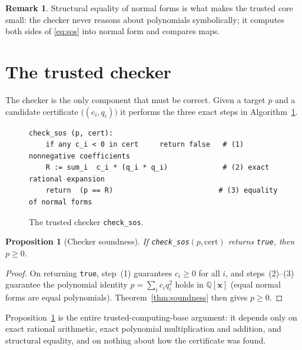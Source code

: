 \documentclass[11pt]{article}
\theoremstyle{definition}
\newtheorem{remark}[definition]{Remark}
\theoremstyle{plain}
\newtheorem{proposition}[definition]{Proposition}
\newcommand{\Q}{\mathbb{Q}}
\newcommand{\x}{\mathbf{x}}
\begin{document}
\begin{remark}
Structural equality of normal forms is what makes the trusted core small: the
checker never reasons about polynomials symbolically; it computes both sides of
\eqref{eq:sos} into normal form and compares maps.
\end{remark}

\section{The trusted checker}
\label{sec:checker}

The checker is the only component that must be correct. Given a target $p$ and a
candidate certificate $\bigl((c_i,q_i)\bigr)$ it performs the three exact steps
in Algorithm~\ref{alg:check}.

\begin{figure}[h]
\centering
\begin{minipage}{0.92\linewidth}
\begin{lstlisting}[style=mono]
check_sos (p, cert):
    if any c_i < 0 in cert     return false   # (1) nonnegative coefficients
    R := sum_i  c_i * (q_i * q_i)             # (2) exact rational expansion
    return  (p == R)                         # (3) equality of normal forms
\end{lstlisting}
\end{minipage}
\caption{The trusted checker \texttt{check\_sos}.}
\label{alg:check}
\end{figure}

\begin{proposition}[Checker soundness]\label{prop:checker}
If \textup{\texttt{check\_sos}}$(p,\text{cert})$ returns \textup{\texttt{true}},
then $p \ge 0$.
\end{proposition}
\begin{proof}
On returning \texttt{true}, step~(1) guarantees $c_i \ge 0$ for all $i$, and
steps~(2)--(3) guarantee the polynomial identity $p = \sum_i c_i q_i^2$ holds in
$\Q[\x]$ (equal normal forms are equal polynomials). Theorem~\ref{thm:soundness}
then gives $p \ge 0$.
\end{proof}

Proposition~\ref{prop:checker} is the entire trusted-computing-base argument: it
depends only on exact rational arithmetic, exact polynomial multiplication and
addition, and structural equality, and on nothing about how the certificate was
found.
\end{document}
